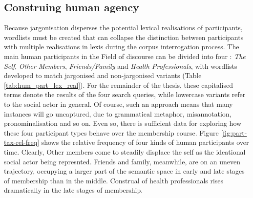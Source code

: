 
\subsection{Construing human agency}

Because jargonisation disperses the potential lexical realisations of participants, wordlists must be created that can collapse the distinction between participants with multiple realisations in lexis during the \gls{corpus} interrogation process. The main human participants \cite[or social actors---see][]{van_leeuwen_representation_1996} in the Field of discourse can be divided into four : \emph{The Self}, \emph{Other Members}, \emph{Friends\slash Family} and \emph{Health Professionals}, with wordlists developed to match jargonised and non\hyp{}jargonised variants (Table \ref{tab:hum_part_lex_real}). For the remainder of the thesis, these capitalised terms denote the results of the four search queries, while lowercase variants refer to the social actor in general. Of course, such an approach means that many instances will go uncaptured, due to grammatical metaphor, misannotation, pronominalisation and so on. Even so, there is sufficient data for exploring how these four participant types behave over the membership course. Figure \ref{fig:part-tax-rel-freq} shows the relative frequency of four kinds of human participants over time. Clearly, Other \glspl{member} come to steadily displace the self as the ideational social actor being represnted. Friends and family, meanwhile, are on an uneven trajectory, occupying a larger part of the semantic space in early and late stages of membership than in the middle. Construal of health professionals rises dramatically in the late stages of membership. %

